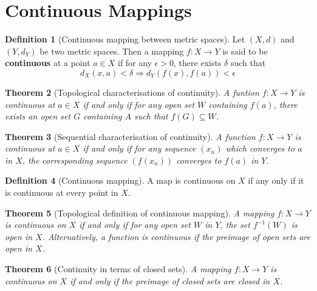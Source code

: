\documentclass[10pt, oneside, reqno]{amsart}
\theoremstyle{plain}%
\newtheorem{thm}{Theorem}[section]
\theoremstyle{definition}
\newtheorem{defn}[thm]{Definition}
\theoremstyle{remark}
\newcommand{\met}{(X,d)}
\begin{document}



\section{Continuous Mappings} %
\label{sec:continuous_mappings}

\begin{defn}[Continuous mapping between metric spaces]
    Let $\met$ and $(Y, d_Y)$ be two metric spaces.  Then a mapping $f : X \rightarrow Y$ is said to be \textbf{continuous} at a point $a \in X$ if for any $\epsilon > 0$, there exists $\delta$ such that \[
        d_X(x,a) < \delta \Rightarrow d_Y(f(x), f(a)) < \epsilon
    \]
\end{defn}

\begin{thm}[Topological characterisations of continuity]
    A funtion $f : X \rightarrow Y$ is continuous at $a \in X$ if and only if for any open set $W$ containing $f(a)$, there exists an open set $G$ containing $A$ such that $f(G) \subseteq W$.  
\end{thm}

\begin{thm}[Sequential characterisation of continuity]
    A function $f: X \rightarrow Y$ is continuous at $a \in X$ if and only if for any sequence $(x_n)$ which converges to $a$ in $X$, the corresponding sequence $(f(x_n))$ converges to $f(a)$ in $Y$.
\end{thm}


\begin{defn}[Continuous mapping]
    A map is continuous on $X$ if any only if it is continuous at every point in $X$.
\end{defn}

\begin{thm}[Topological definition of continuous mapping]
    A mapping $f: X \rightarrow Y$ is continuous on $X$ if and only if for any open set $W$ in $Y$, the set $f^{-1}(W)$ is open in $X$. Alternatively, a function is continuous if the preimage of open sets are open in $X$.
\end{thm}

\begin{thm}[Continuity in terms of closed sets]
    A mapping $f: X \rightarrow Y$ is continuous on $X$ if and only if the preimage of closed sets are closed in $X$.
\end{thm}

\end{document}
